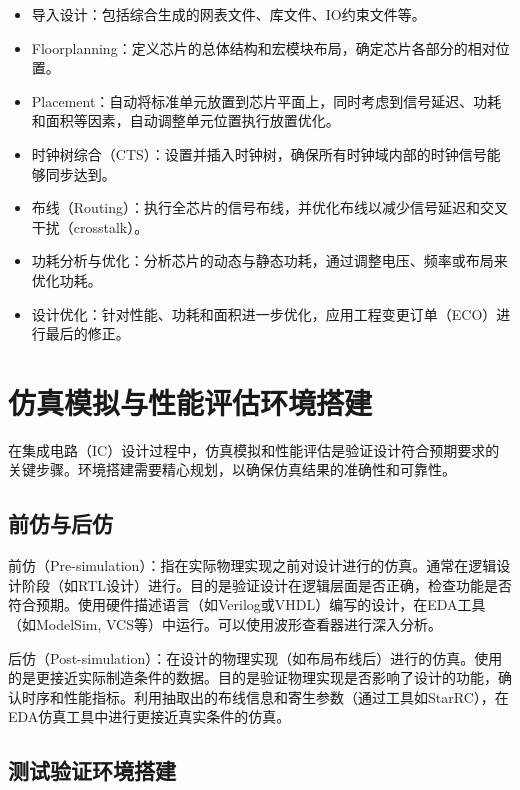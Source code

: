 \begin{itemize}
\tightlist
\item
  导入设计：包括综合生成的网表文件、库文件、IO约束文件等。
\item
  Floorplanning：定义芯片的总体结构和宏模块布局，确定芯片各部分的相对位置。
\item
  Placement：自动将标准单元放置到芯片平面上，同时考虑到信号延迟、功耗和面积等因素，自动调整单元位置执行放置优化。
\item
  时钟树综合（CTS）：设置并插入时钟树，确保所有时钟域内部的时钟信号能够同步达到。
\item
  布线（Routing）：执行全芯片的信号布线，并优化布线以减少信号延迟和交叉干扰（crosstalk）。
\item
  功耗分析与优化：分析芯片的动态与静态功耗，通过调整电压、频率或布局来优化功耗。
\item
  设计优化：针对性能、功耗和面积进一步优化，应用工程变更订单（ECO）进行最后的修正。
\end{itemize}

\section{仿真模拟与性能评估环境搭建}\label{sec:15-chip-preparation-011}

在集成电路（IC）设计过程中，仿真模拟和性能评估是验证设计符合预期要求的关键步骤。环境搭建需要精心规划，以确保仿真结果的准确性和可靠性。

\subsection{前仿与后仿}\label{sec:15-chip-preparation-012}

前仿（Pre-simulation）：指在实际物理实现之前对设计进行的仿真。通常在逻辑设计阶段（如RTL设计）进行。目的是验证设计在逻辑层面是否正确，检查功能是否符合预期。使用硬件描述语言（如Verilog或VHDL）编写的设计，在EDA工具（如ModelSim,
VCS等）中运行。可以使用波形查看器进行深入分析。

后仿（Post-simulation）：在设计的物理实现（如布局布线后）进行的仿真。使用的是更接近实际制造条件的数据。目的是验证物理实现是否影响了设计的功能，确认时序和性能指标。利用抽取出的布线信息和寄生参数（通过工具如StarRC），在EDA仿真工具中进行更接近真实条件的仿真。

\subsection{测试验证环境搭建}\label{sec:15-chip-preparation-013}

